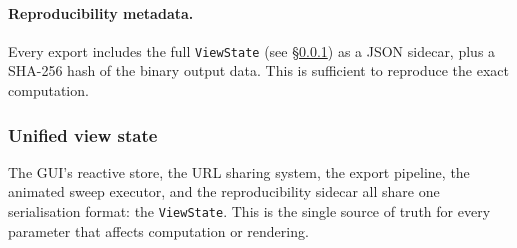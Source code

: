 \documentclass[11pt]{report}
\begin{document}
\paragraph{Reproducibility metadata.} Every export includes the full \texttt{ViewState} (see \S\ref{sec:view_state}) as a JSON sidecar, plus a SHA-256 hash of the binary output data. This is sufficient to reproduce the exact computation.


\subsubsection{Unified view state}
\label{sec:view_state}

The GUI's reactive store, the URL sharing system, the export pipeline, the animated sweep executor, and the reproducibility sidecar all share one serialisation format: the \texttt{ViewState}. This is the single source of truth for every parameter that affects computation or rendering.
\end{document}
